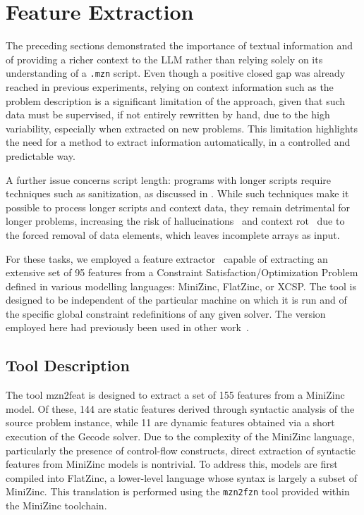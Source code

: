 \documentclass[../../main]{subfiles}
\begin{document}
\section{Feature Extraction}
\label{sec:features}
The preceding sections demonstrated the importance of textual information and of providing a richer context to the LLM rather than relying solely on its understanding of a \texttt{.mzn} script. Even though a positive closed gap was already reached in previous experiments, relying on context information such as the problem description is a significant limitation of the approach, given that such data must be supervised, if not entirely rewritten by hand, due to the high variability, especially when extracted on new problems. This limitation highlights the need for a method to extract information automatically, in a controlled and predictable way.

A further issue concerns script length: programs with longer scripts require techniques such as sanitization, as discussed in . While such techniques make it possible to process longer scripts and context data, they remain detrimental for longer problems, increasing the risk of hallucinations~\cite{LLMhallucination} and context rot~\cite{ContextRot} due to the forced removal of data elements, which leaves incomplete arrays as input.

For these tasks, we employed a feature extractor~\cite{mzn2feat} capable of extracting an extensive set of 95 features from a Constraint Satisfaction/Optimization Problem defined in various modelling languages: MiniZinc, FlatZinc, or XCSP. The tool is designed to be independent of the particular machine on which it is run and of the specific global constraint redefinitions of any given solver. The version employed here had previously been used in other work~\cite{splitAndBounds, SUNNY-CP, multicoreCS}.

\subsection{Tool Description}
The tool mzn2feat is designed to extract a set of 155 features from a MiniZinc model. Of these, 144 are static features derived through syntactic analysis of the source problem instance, while 11 are dynamic features obtained via a short execution of the Gecode solver. Due to the complexity of the MiniZinc language, particularly the presence of control-flow constructs, direct extraction of syntactic features from MiniZinc models is nontrivial. To address this, models are first compiled into FlatZinc, a lower-level language whose syntax is largely a subset of MiniZinc. This translation is performed using the \texttt{mzn2fzn} tool provided within the MiniZinc toolchain.
\end{document}
